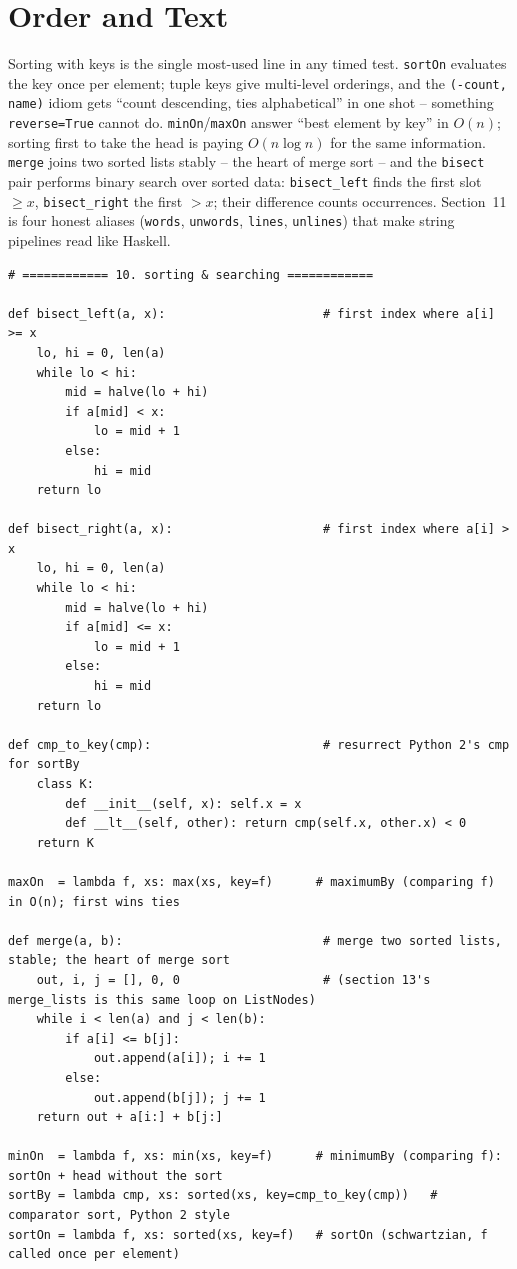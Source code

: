 \documentclass[11pt,letterpaper]{book}
\begin{document}
\chapter{Order and Text}

Sorting with keys is the single most-used line in any timed test.
\texttt{sortOn} evaluates the key once per element; tuple keys give multi-level
orderings, and the \texttt{(-count, name)} idiom gets ``count descending, ties
alphabetical'' in one shot -- something \texttt{reverse=True} cannot do.
\texttt{minOn}/\texttt{maxOn} answer ``best element by key'' in $O(n)$;
sorting first to take the head is paying $O(n \log n)$ for the same
information. \texttt{merge} joins two sorted lists stably -- the heart of merge
sort -- and the \texttt{bisect} pair performs binary search over sorted data:
\texttt{bisect\_left} finds the first slot $\ge x$, \texttt{bisect\_right} the
first $> x$; their difference counts occurrences. Section~11 is four honest
aliases (\texttt{words}, \texttt{unwords}, \texttt{lines}, \texttt{unlines})
that make string pipelines read like Haskell.
\begin{lstlisting}[style=code]
# ============ 10. sorting & searching ============

def bisect_left(a, x):                      # first index where a[i] >= x
    lo, hi = 0, len(a)
    while lo < hi:
        mid = halve(lo + hi)
        if a[mid] < x:
            lo = mid + 1
        else:
            hi = mid
    return lo

def bisect_right(a, x):                     # first index where a[i] > x
    lo, hi = 0, len(a)
    while lo < hi:
        mid = halve(lo + hi)
        if a[mid] <= x:
            lo = mid + 1
        else:
            hi = mid
    return lo

def cmp_to_key(cmp):                        # resurrect Python 2's cmp for sortBy
    class K:
        def __init__(self, x): self.x = x
        def __lt__(self, other): return cmp(self.x, other.x) < 0
    return K

maxOn  = lambda f, xs: max(xs, key=f)      # maximumBy (comparing f) in O(n); first wins ties

def merge(a, b):                            # merge two sorted lists, stable; the heart of merge sort
    out, i, j = [], 0, 0                    # (section 13's merge_lists is this same loop on ListNodes)
    while i < len(a) and j < len(b):
        if a[i] <= b[j]:
            out.append(a[i]); i += 1
        else:
            out.append(b[j]); j += 1
    return out + a[i:] + b[j:]

minOn  = lambda f, xs: min(xs, key=f)      # minimumBy (comparing f): sortOn + head without the sort
sortBy = lambda cmp, xs: sorted(xs, key=cmp_to_key(cmp))   # comparator sort, Python 2 style
sortOn = lambda f, xs: sorted(xs, key=f)   # sortOn (schwartzian, f called once per element)
\end{lstlisting}
\end{document}
